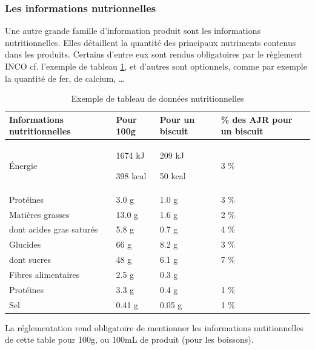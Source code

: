                \subsubsection{Les informations nutrionnelles}

                Une autre grande famille d'information produit sont les informations nutritionnelles. 
                Elles détaillent la quantité des principaux nutriments contenus dans les produits.
                Certains d'entre eux sont rendus obligatoires par le règlement INCO\cite{incotext}\cite{incoexpl} cf. l'exemple de tableau \ref{tab:donnees_nut}, et d'autres sont optionnels, comme par exemple la quantité de fer, de calcium, \dots

                \begin{table}[htbp]
                    \begin{center}
                    \begin{tabularx}{\linewidth}{|X|X|X|X|}
                        \hline
                        \textbf{Informations nutritionnelles} & \textbf{Pour 100g} & \textbf{Pour un biscuit} & \textbf{\% des AJR pour un biscuit} \\
                        \hline
                        \'{E}nergie &1674 kJ
                        
                        398 kcal & 209 kJ
                        
                        50 kcal & 3 \% \\
                        \hline
                        Protéines & 3.0 g & 1.0 g & 3 \% \\ 
                        \hline
                        Matières grasses & 13.0 g & 1.6 g & 2 \% \\
                        \hline
                        dont acides gras saturés & 5.8 g & 0.7 g & 4 \% \\
                        \hline
                        Glucides & 66 g & 8.2 g & 3 \% \\
                        \hline
                        dont sucres & 48 g & 6.1 g & 7 \% \\
                        \hline
                        Fibres alimentaires & 2.5 g & 0.3 g &\\
                        \hline
                        Protéines & 3.3 g & 0.4 g & 1 \% \\
                        \hline
                        Sel & 0.41 g & 0.05 g & 1 \% \\
                        \hline
                    \end{tabularx}
                    \end{center}
                    \caption{Exemple de tableau de données nutritionnelles}
                    \label{tab:donnees_nut}
                \end{table}
                La réglementation rend obligatoire de mentionner les informations nutitionnelles de cette table pour 100g, ou 100mL de produit (pour les boissons).

